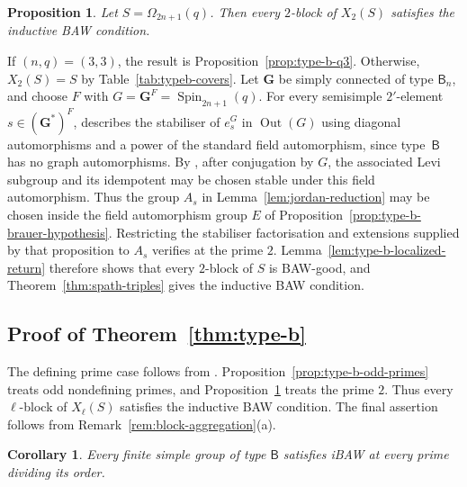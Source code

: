 \documentclass[10pt]{amsart}
\newtheorem{proposition}[theorem]{Proposition}
\newtheorem{corollary}[theorem]{Corollary}
\theoremstyle{definition}
\let\oldendproof\endproof
\renewenvironment{proof}[1][\proofname]{%
  \oldproof[\bfseries #1]%
}{\oldendproof}
\DeclareMathOperator{\Out}{Out}
\numberwithin{equation}{section}
\numberwithin{table}{section}
\begin{document}
\begin{proposition}\label{prop:type-b-two-high-rank}
Let $S=\Omega_{2n+1}(q)$.
Then every $2$-block of $X_2(S)$ satisfies the inductive BAW condition.
\end{proposition}

\begin{proof}
If $(n,q)=(3,3)$, the result is Proposition~\ref{prop:type-b-q3}.
Otherwise, $X_2(S)=S$ by Table~\ref{tab:typeb-covers}.
Let $\mathbf G$ be simply connected of type $\mathsf B_n$, and
choose $F$ with $G=\mathbf G^F=\operatorname{Spin}_{2n+1}(q)$.
For every semisimple $2'$-element $s\in(\mathbf G^*)^F$,
\cite[Corollary~4.2]{Ruhstorfer2022Derived} describes the stabiliser
of $e_s^G$ in $\Out(G)$ using diagonal automorphisms and a power of
the standard field automorphism, since type~$\mathsf B$ has no
graph automorphisms.
By \cite[Lemma~4.5(a)--(b)]{Ruhstorfer2022Derived}, after conjugation
by $G$, the associated Levi subgroup and its idempotent may be chosen
stable under this field automorphism. Thus the group $A_s$ in
Lemma~\ref{lem:jordan-reduction} may be chosen inside the field
automorphism group $E$ of Proposition~\ref{prop:type-b-brauer-hypothesis}.
Restricting the stabiliser factorisation and extensions supplied by
that proposition to $A_s$ verifies
\cite[Assumption~5.3]{FengLiZhang2022Jordan} at the prime $2$.
Lemma~\ref{lem:type-b-localized-return} therefore shows that every
$2$-block of $S$ is BAW-good, and
Theorem~\ref{thm:spath-triples} gives the inductive BAW condition.
\end{proof}

\subsection{Proof of Theorem~\ref{thm:type-b}}
\label{subsec:type-b-completion}

\begin{proof}
The defining prime case follows from \cite[Theorem~C]{Spath2013}.
Proposition~\ref{prop:type-b-odd-primes} treats odd nondefining primes,
and Proposition~\ref{prop:type-b-two-high-rank} treats the prime $2$.
Thus every $\ell$-block of $X_\ell(S)$ satisfies the inductive BAW
condition. The final assertion follows from
Remark~\ref{rem:block-aggregation}\textup{(a)}.
\end{proof}

\begin{corollary}\label{cor:type-b-census}
Every finite simple group of type $\mathsf B$ satisfies iBAW at every prime
dividing its order.
\end{corollary}
\end{document}
